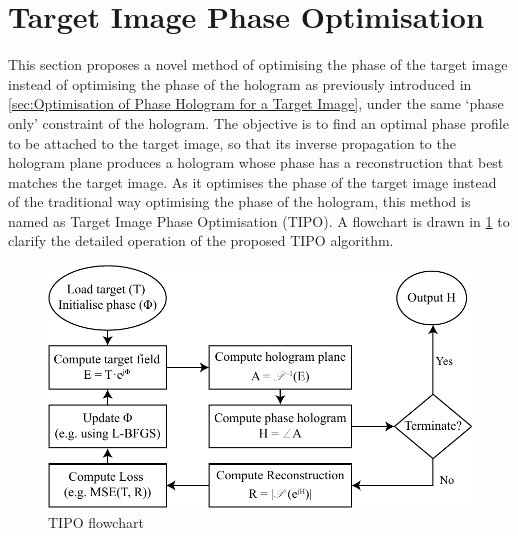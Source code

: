 \section{Target Image Phase Optimisation}
This section proposes a novel method of optimising the phase of the target image instead of optimising the phase of the hologram as previously introduced in \cref{sec:Optimisation of Phase Hologram for a Target Image}, under the same `phase only' constraint of the hologram. The objective is to find an optimal phase profile to be attached to the target image, so that its inverse propagation to the hologram plane produces a hologram whose phase has a reconstruction that best matches the target image. As it optimises the phase of the target image instead of the traditional way optimising the phase of the hologram, this method is named as Target Image Phase Optimisation (TIPO). A flowchart is drawn in \cref{fig:TIPO_flowchart} to clarify the detailed operation of the proposed TIPO algorithm.

\begin{figure}[H]
	\centering
	\includegraphics[width=\textwidth]{TIPO_flowchart.pdf}
	\caption{TIPO flowchart}
	\label{fig:TIPO_flowchart}
\end{figure}

